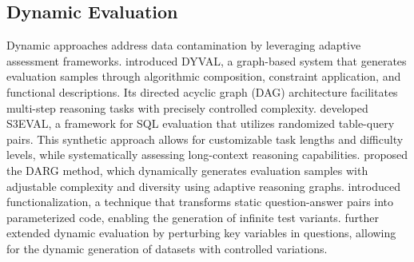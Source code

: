 \subsection{Dynamic Evaluation}
\label{sec:dynamic evaluation}

Dynamic approaches address data contamination by leveraging adaptive assessment frameworks. \citet{zhu2024dyvaldynamicevaluationlarge} introduced DYVAL, a graph-based system that generates evaluation samples through algorithmic composition, constraint application, and functional descriptions. Its directed acyclic graph (DAG) architecture facilitates multi-step reasoning tasks with precisely controlled complexity. \citet{lei-etal-2024-s3eval} developed S3EVAL, a framework for SQL evaluation that utilizes randomized table-query pairs. This synthetic approach allows for customizable task lengths and difficulty levels, while systematically assessing long-context reasoning capabilities. \citet{zhang2024darg} proposed the DARG method, which dynamically generates evaluation samples with adjustable complexity and diversity using adaptive reasoning graphs. \citet{srivastava2024functional} introduced functionalization, a technique that transforms static question-answer pairs into parameterized code, enabling the generation of infinite test variants. \citet{qian2024varbench} further extended dynamic evaluation by perturbing key variables in questions, allowing for the dynamic generation of datasets with controlled variations.



